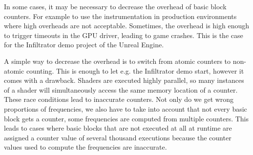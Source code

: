 \begin{figure}
\centering
\pgfplotsset{width=0.75\textwidth}
\centering
{}
\label{dia:overhead}
\end{figure}

\begin{figure}
\centering
{}
\label{dia:overhead_tab}
\end{figure}


In some cases, it may be necessary to decrease the overhead of basic block counters. For example to use the instrumentation in production environments where high overheads are not acceptable.
Sometimes, the overhead is high enough to trigger timeouts in the GPU driver, leading to game crashes. This is the case for the Infiltrator demo project of the Unreal Engine.

A simple way to decrease the overhead is to switch from atomic counters to non-atomic counting. This is enough to let e.g. the Infiltrator demo start, however it comes with a drawback. Shaders are executed highly parallel, so many instances of a shader will simultaneously access the same memory location of a counter.
These race conditions lead to inaccurate counters. Not only do we get wrong proportions of frequencies, we also have to take into account that not every basic block gets a counter, some frequencies are computed from multiple counters. This leads to cases where basic blocks that are not executed at all at runtime are assigned a counter value of several thousand executions because the counter values used to compute the frequencies are inaccurate.


